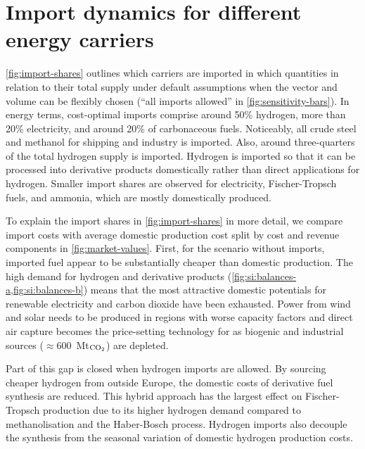 \documentclass[5p,10pt]{elsarticle}
\begin{document}
\section*{Import dynamics for different energy carriers}


\cref{fig:import-shares} outlines which carriers are imported in which
quantities in relation to their total supply under default assumptions when the
vector and volume can be flexibly chosen (``all imports allowed'' in
\cref{fig:sensitivity-bars}). In energy terms, cost-optimal imports comprise
around 50\% hydrogen, more than 20\% electricity, and around 20\% of
carbonaceous fuels. Noticeably, all crude steel and methanol for shipping and
industry is imported. Also, around three-quarters of the total hydrogen supply
is imported. Hydrogen is imported so that it can be processed into derivative
products domestically rather than direct applications for hydrogen. Smaller
import shares are observed for electricity, Fischer-Tropsch fuels, and ammonia,
which are mostly domestically produced.


To explain the import shares in \cref{fig:import-shares} in more detail, we
compare import costs with average domestic production cost split by cost and
revenue components in \cref{fig:market-values}. First, for the scenario without
imports, imported fuel appear to be substantially cheaper than domestic
production. The high demand for hydrogen and derivative products
(\cref{fig:si:balances-a,fig:si:balances-b}) means that the most attractive
domestic potentials for renewable electricity and carbon dioxide have been
exhausted. Power from wind and solar needs to be produced in regions with worse
capacity factors and direct air capture becomes the price-setting technology for
 as biogenic and industrial sources ($\approx$600~Mt$_\text{\ce{CO2}}$)
are depleted.


Part of this gap is closed when hydrogen imports are allowed. By sourcing
cheaper hydrogen from outside Europe, the domestic costs of derivative fuel
synthesis are reduced. This hybrid approach has the largest effect on
Fischer-Tropsch production due to its higher hydrogen demand compared to
methanolisation and the Haber-Bosch process. Hydrogen imports also decouple the
synthesis from the seasonal variation of domestic hydrogen production costs.
\end{document}
